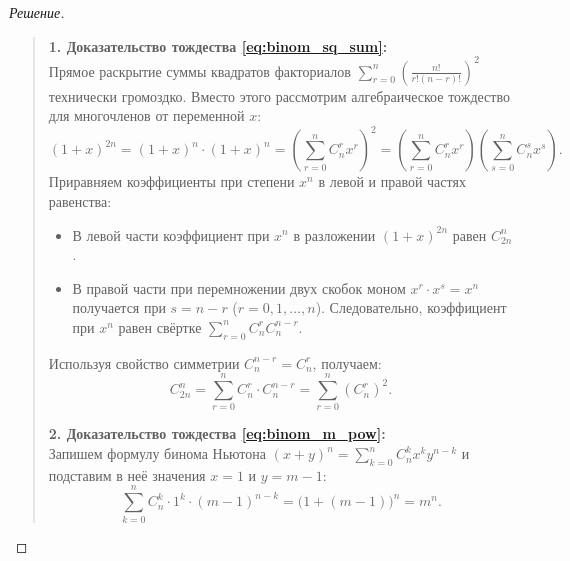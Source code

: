 \begin{proof}[Решение]~\\
    \begin{quote}
        \textbf{1. Доказательство тождества \eqref{eq:binom_sq_sum}:}\\
        Прямое раскрытие суммы квадратов факториалов 
        $\sum_{r=0}^n \left(\frac{n!}{r!(n - r)!}\right)^2$ технически 
        громоздко. Вместо этого рассмотрим алгебраическое тождество для 
        многочленов от переменной $x$:
        \[
            (1 + x)^{2n} = (1 + x)^n \cdot (1 + x)^n = 
            \left(\sum_{r=0}^{n} C_n^r x^r\right)^2 = 
            \left(\sum_{r=0}^{n} C_n^r x^r\right) 
            \left(\sum_{s=0}^{n} C_n^s x^s\right).
        \]
        Приравняем коэффициенты при степени $x^n$ в левой и правой частях 
        равенства:
        \begin{itemize}
            \item В левой части коэффициент при $x^n$ в разложении 
            $(1 + x)^{2n}$ равен $C_{2n}^n$.
            \item В правой части при перемножении двух скобок моном 
            $x^r \cdot x^s = x^n$ получается при $s = n - r$ 
            ($r = 0, 1, \dots, n$). Следовательно, коэффициент при $x^n$ 
            равен свёртке $\sum_{r=0}^n C_n^r C_n^{n-r}$.
        \end{itemize}
        Используя свойство симметрии $C_n^{n-r} = C_n^r$, получаем:
        \[
            C_{2n}^n = \sum_{r=0}^{n} C_n^r \cdot C_n^{n-r} = 
            \sum_{r=0}^{n} (C_n^r)^2.
        \]

        \textbf{2. Доказательство тождества \eqref{eq:binom_m_pow}:}\\
        Запишем формулу бинома Ньютона $(x + y)^n = \sum_{k=0}^n C_n^k x^k y^{n-k}$ 
        и подставим в неё значения $x = 1$ и $y = m - 1$:
        \[
            \sum_{k=0}^{n} C_n^k \cdot 1^k \cdot (m - 1)^{n-k} = 
            \bigl(1 + (m - 1)\bigr)^n = m^n.
        \]


\end{quote}
\end{proof}
